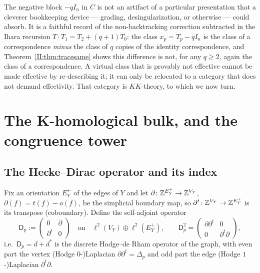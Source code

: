 \begin{remark}
The negative block $-qI_n$ in $C$ is not an artifact of a particular presentation that a
cleverer bookkeeping device --- grading, desingularization, or otherwise --- could
absorb. It is a faithful record of the non-backtracking correction subtracted in the
Ihara recursion $T\cdot T_1=T_2+(q+1)T_0$: the class $x_p=T_p-qI_n$ is the class of a
correspondence \emph{minus} the class of $q$ copies of the identity correspondence, and
Theorem~\ref{II:thm:tracesame} shows this difference is not, for any $q\ge2$, again the
class of a correspondence. A virtual class that is provably not effective cannot be made
effective by re-describing it; it can only be relocated to a category that does not
demand effectivity. That category is $KK$-theory, to which we now turn.
\end{remark}

\section{The K-homological bulk, and the congruence tower}\label{II:sec:tower}

\subsection{The Hecke--Dirac operator and its index}

\begin{definition}\label{II:def:dirac}
Fix an orientation $E_Y^+$ of the edges of $Y$ and let
$\partial\colon\mathbb{Z}^{E_Y^+}\to\mathbb{Z}^{V_Y}$, $\partial(f)=t(f)-o(f)$, be the simplicial
boundary map, so $\partial^t\colon\mathbb{Z}^{V_Y}\to\mathbb{Z}^{E_Y^+}$ is its transpose (coboundary).
Define the self-adjoint operator
\[
\mathsf D_p:=\begin{pmatrix}0&\partial\\\partial^t&0\end{pmatrix}\quad\text{on}\quad
\ell^2(V_Y)\oplus\ell^2(E_Y^+),\qquad
\mathsf D_p^2=\begin{pmatrix}\partial\partial^t&0\\0&\partial^t\partial\end{pmatrix},
\]
i.e.\ $\mathsf D_p=d+d^*$ is the discrete Hodge--de Rham operator of the graph, with
even part the vertex (Hodge $0$-)Laplacian $\partial\partial^t=\Delta_p$ and odd part
the edge (Hodge $1$-)Laplacian $\partial^t\partial$.
\end{definition}

